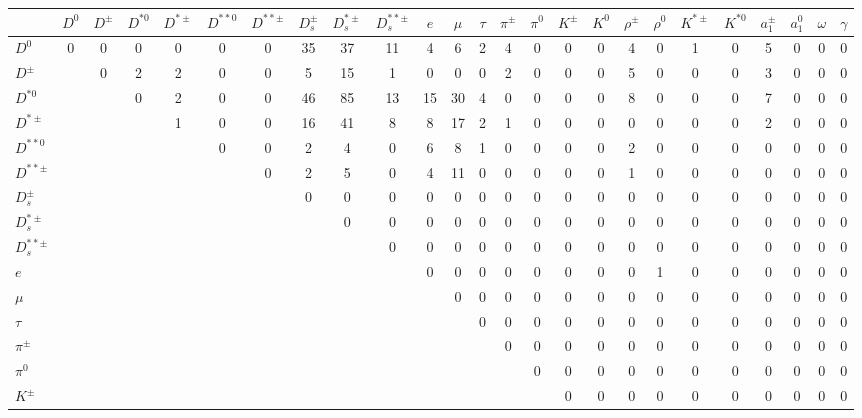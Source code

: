 \documentclass[6pt]{article}
\begin{document}
\begin{landscape} \begin{tabular}{|l||cccc|cc|ccc|ccc|cccc|cccc|cccc|}
\hline
 & $D^0$ & $D^{\pm}$ & $D^{*0}$ & $D^{*\pm}$ & $D^{**0}$ & $D^{**\pm}$ & $D_s^{\pm}$ & $D_s^{*\pm}$ & $D_s^{**\pm}$ & $e$ & $\mu$ & $\tau$ & $\pi^{\pm}$ & $\pi^0$ & $K^{\pm}$ & $K^0$ & $\rho^{\pm}$ & $\rho^0$ & $K^{*\pm}$ & $K^{*0}$ & $a_1^{\pm}$ & $a_1^0$ & $\omega$ & $\gamma$ \\ \hline \hline
$D^0$  & 0 & 0 & 0 & 0 & 0 & 0 & 35 & 37 & 11 & 4 & 6 & 2 & 4 & 0 & 0 & 0 & 4 & 0 & 1 & 0 & 5 & 0 & 0 & 0 \\
$D^{\pm}$  &  & 0 & 2 & 2 & 0 & 0 & 5 & 15 & 1 & 0 & 0 & 0 & 2 & 0 & 0 & 0 & 5 & 0 & 0 & 0 & 3 & 0 & 0 & 0 \\
$D^{*0}$  &  &  & 0 & 2 & 0 & 0 & 46 & 85 & 13 & 15 & 30 & 4 & 0 & 0 & 0 & 0 & 8 & 0 & 0 & 0 & 7 & 0 & 0 & 0 \\
$D^{*\pm}$  &  &  &  & 1 & 0 & 0 & 16 & 41 & 8 & 8 & 17 & 2 & 1 & 0 & 0 & 0 & 0 & 0 & 0 & 0 & 2 & 0 & 0 & 0 \\
\hline 
$D^{**0}$  &  &  &  &  & 0 & 0 & 2 & 4 & 0 & 6 & 8 & 1 & 0 & 0 & 0 & 0 & 2 & 0 & 0 & 0 & 0 & 0 & 0 & 0 \\
$D^{**\pm}$  &  &  &  &  &  & 0 & 2 & 5 & 0 & 4 & 11 & 0 & 0 & 0 & 0 & 0 & 1 & 0 & 0 & 0 & 0 & 0 & 0 & 0 \\
\hline 
$D_s^{\pm}$  &  &  &  &  &  &  & 0 & 0 & 0 & 0 & 0 & 0 & 0 & 0 & 0 & 0 & 0 & 0 & 0 & 0 & 0 & 0 & 0 & 0 \\
$D_s^{*\pm}$  &  &  &  &  &  &  &  & 0 & 0 & 0 & 0 & 0 & 0 & 0 & 0 & 0 & 0 & 0 & 0 & 0 & 0 & 0 & 0 & 0 \\
$D_s^{**\pm}$  &  &  &  &  &  &  &  &  & 0 & 0 & 0 & 0 & 0 & 0 & 0 & 0 & 0 & 0 & 0 & 0 & 0 & 0 & 0 & 0 \\
\hline 
$e$  &  &  &  &  &  &  &  &  &  & 0 & 0 & 0 & 0 & 0 & 0 & 0 & 0 & 1 & 0 & 0 & 0 & 0 & 0 & 0 \\
$\mu$  &  &  &  &  &  &  &  &  &  &  & 0 & 0 & 0 & 0 & 0 & 0 & 0 & 0 & 0 & 0 & 0 & 0 & 0 & 0 \\
$\tau$  &  &  &  &  &  &  &  &  &  &  &  & 0 & 0 & 0 & 0 & 0 & 0 & 0 & 0 & 0 & 0 & 0 & 0 & 0 \\
\hline 
$\pi^{\pm}$  &  &  &  &  &  &  &  &  &  &  &  &  & 0 & 0 & 0 & 0 & 0 & 0 & 0 & 0 & 0 & 0 & 0 & 0 \\
$\pi^0$  &  &  &  &  &  &  &  &  &  &  &  &  &  & 0 & 0 & 0 & 0 & 0 & 0 & 0 & 0 & 0 & 0 & 0 \\
$K^{\pm}$  &  &  &  &  &  &  &  &  &  &  &  &  &  &  & 0 & 0 & 0 & 0 & 0 & 0 & 0 & 0 & 0 & 0 \\

\end{tabular}
\end{landscape}
\end{document}
